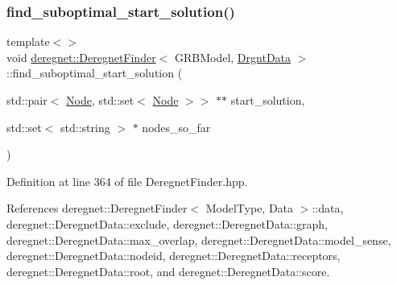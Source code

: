 \subsubsection{\texorpdfstring{find\+\_\+suboptimal\+\_\+start\+\_\+solution()}{find\_suboptimal\_start\_solution()}\hspace{0.1cm}{\footnotesize\ttfamily [2/3]}}
{\footnotesize\ttfamily template$<$$>$ \\
void \hyperlink{classderegnet_1_1DeregnetFinder}{deregnet\+::\+Deregnet\+Finder}$<$ G\+R\+B\+Model, \hyperlink{classderegnet_1_1DrgntData}{Drgnt\+Data} $>$\+::find\+\_\+suboptimal\+\_\+start\+\_\+solution (\begin{DoxyParamCaption}\item[{std\+::pair$<$ \hyperlink{namespacederegnet_a744bad34f2de9856d36715a445f027f3}{Node}, std\+::set$<$ \hyperlink{namespacederegnet_a744bad34f2de9856d36715a445f027f3}{Node} $>$$>$ $\ast$$\ast$}]{start\+\_\+solution,  }\item[{std\+::set$<$ std\+::string $>$ $\ast$}]{nodes\+\_\+so\+\_\+far }\end{DoxyParamCaption})\hspace{0.3cm}{\ttfamily [inline]}}



Definition at line 364 of file Deregnet\+Finder.\+hpp.



References deregnet\+::\+Deregnet\+Finder$<$ Model\+Type, Data $>$\+::data, deregnet\+::\+Deregnet\+Data\+::exclude, deregnet\+::\+Deregnet\+Data\+::graph, deregnet\+::\+Deregnet\+Data\+::max\+\_\+overlap, deregnet\+::\+Deregnet\+Data\+::model\+\_\+sense, deregnet\+::\+Deregnet\+Data\+::nodeid, deregnet\+::\+Deregnet\+Data\+::receptors, deregnet\+::\+Deregnet\+Data\+::root, and deregnet\+::\+Deregnet\+Data\+::score.


